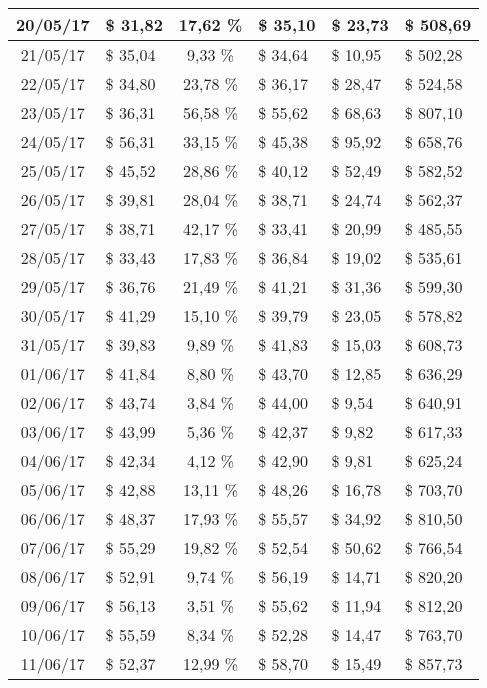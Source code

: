 \begin{center}
\begin{small}
\begin{longtable}{|c|l|c|l|l|l|}
20/05/17 & \$ 31,82 & 17,62 \% & \$ 35,10 & \$ 23,73 & \$ 508,69 \\ \hline
21/05/17 & \$ 35,04 & 9,33 \% & \$ 34,64 & \$ 10,95 & \$ 502,28 \\ \hline
22/05/17 & \$ 34,80 & 23,78 \% & \$ 36,17 & \$ 28,47 & \$ 524,58 \\ \hline
23/05/17 & \$ 36,31 & 56,58 \% & \$ 55,62 & \$ 68,63 & \$ 807,10 \\ \hline
24/05/17 & \$ 56,31 & 33,15 \% & \$ 45,38 & \$ 95,92 & \$ 658,76 \\ \hline
25/05/17 & \$ 45,52 & 28,86 \% & \$ 40,12 & \$ 52,49 & \$ 582,52 \\ \hline
26/05/17 & \$ 39,81 & 28,04 \% & \$ 38,71 & \$ 24,74 & \$ 562,37 \\ \hline
27/05/17 & \$ 38,71 & 42,17 \% & \$ 33,41 & \$ 20,99 & \$ 485,55 \\ \hline
28/05/17 & \$ 33,43 & 17,83 \% & \$ 36,84 & \$ 19,02 & \$ 535,61 \\ \hline
29/05/17 & \$ 36,76 & 21,49 \% & \$ 41,21 & \$ 31,36 & \$ 599,30 \\ \hline
30/05/17 & \$ 41,29 & 15,10 \% & \$ 39,79 & \$ 23,05 & \$ 578,82 \\ \hline
31/05/17 & \$ 39,83 & 9,89 \% & \$ 41,83 & \$ 15,03 & \$ 608,73 \\ \hline
01/06/17 & \$ 41,84 & 8,80 \% & \$ 43,70 & \$ 12,85 & \$ 636,29 \\ \hline
02/06/17 & \$ 43,74 & 3,84 \% & \$ 44,00 & \$ 9,54 & \$ 640,91 \\ \hline
03/06/17 & \$ 43,99 & 5,36 \% & \$ 42,37 & \$ 9,82 & \$ 617,33 \\ \hline
04/06/17 & \$ 42,34 & 4,12 \% & \$ 42,90 & \$ 9,81 & \$ 625,24 \\ \hline
05/06/17 & \$ 42,88 & 13,11 \% & \$ 48,26 & \$ 16,78 & \$ 703,70 \\ \hline
06/06/17 & \$ 48,37 & 17,93 \% & \$ 55,57 & \$ 34,92 & \$ 810,50 \\ \hline
07/06/17 & \$ 55,29 & 19,82 \% & \$ 52,54 & \$ 50,62 & \$ 766,54 \\ \hline
08/06/17 & \$ 52,91 & 9,74 \% & \$ 56,19 & \$ 14,71 & \$ 820,20 \\ \hline
09/06/17 & \$ 56,13 & 3,51 \% & \$ 55,62 & \$ 11,94 & \$ 812,20 \\ \hline
10/06/17 & \$ 55,59 & 8,34 \% & \$ 52,28 & \$ 14,47 & \$ 763,70 \\ \hline
11/06/17 & \$ 52,37 & 12,99 \% & \$ 58,70 & \$ 15,49 & \$ 857,73 \\ \hline

\end{longtable}
\end{small}
\end{center}
